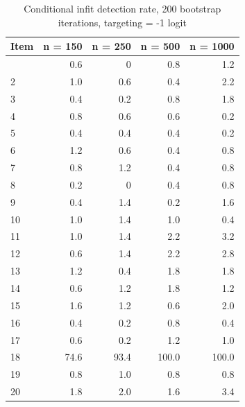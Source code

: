 \documentclass[
  letterpaper,
  DIV=11,
  numbers=noendperiod]{scrartcl}
\begin{document}
\begin{longtable}[]{@{}lrrrr@{}}

\caption{\label{tbl-ifbresults2001}Conditional infit detection rate, 200
bootstrap iterations, targeting = -1 logit}

\tabularnewline

\toprule\noalign{}
Item & n = 150 & n = 250 & n = 500 & n = 1000 \\
\midrule\noalign{}
\endhead
\bottomrule\noalign{}
\endlastfoot
1 & 0.6 & 0 & 0.8 & 1.2 \\
2 & 1.0 & 0.6 & 0.4 & 2.2 \\
3 & 0.4 & 0.2 & 0.8 & 1.8 \\
4 & 0.8 & 0.6 & 0.6 & 0.2 \\
5 & 0.4 & 0.4 & 0.4 & 0.2 \\
6 & 1.2 & 0.6 & 0.4 & 0.8 \\
7 & 0.8 & 1.2 & 0.4 & 0.8 \\
8 & 0.2 & 0 & 0.4 & 0.8 \\
9 & 0.4 & 1.4 & 0.2 & 1.6 \\
10 & 1.0 & 1.4 & 1.0 & 0.4 \\
11 & 1.0 & 1.4 & 2.2 & 3.2 \\
12 & 0.6 & 1.4 & 2.2 & 2.8 \\
13 & 1.2 & 0.4 & 1.8 & 1.8 \\
14 & 0.6 & 1.2 & 1.8 & 1.2 \\
15 & 1.6 & 1.2 & 0.6 & 2.0 \\
16 & 0.4 & 0.2 & 0.8 & 0.4 \\
17 & 0.6 & 0.2 & 1.2 & 1.0 \\
18 & 74.6 & 93.4 & 100.0 & 100.0 \\
19 & 0.8 & 1.0 & 0.8 & 0.8 \\
20 & 1.8 & 2.0 & 1.6 & 3.4 \\

\end{longtable}
\end{document}
